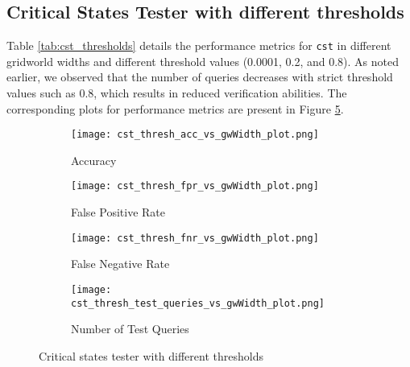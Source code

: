 \subsection{Critical States Tester with different thresholds}
Table \ref{tab:cst_thresholds} details the performance metrics for \texttt{cst} in different gridworld widths and different threshold values (0.0001, 0.2, and 0.8). As noted earlier, we observed that the number of queries decreases with strict threshold values such as 0.8, which results in reduced verification abilities. The corresponding plots for performance metrics are present in Figure \ref{fig:cst_threshold_experiments}.

\begin{figure}[h]
     \centering
     \begin{subfigure}[h]{0.4\textwidth}
         \centering
         \texttt{[image: cst\_thresh\_acc\_vs\_gwWidth\_plot.png]}
         \caption{Accuracy}
         \label{fig:cst_threshold_acc_vs_features_plot}
     \end{subfigure}
    \hspace{5mm}
     \begin{subfigure}[h]{0.4\textwidth}
         \centering
         \texttt{[image: cst\_thresh\_fpr\_vs\_gwWidth\_plot.png]}
         \caption{False Positive Rate}
         \label{fig:cst_threshold_fpr_vs_features_plot}
     \end{subfigure}
     \hspace{5mm}
     \begin{subfigure}[h]{0.4\textwidth}
         \centering
         \texttt{[image: cst\_thresh\_fnr\_vs\_gwWidth\_plot.png]}
         \caption{False Negative Rate}
         \label{fig:cst_threshold_fnr_vs_features_plot}
     \end{subfigure}
     \hspace{5mm}
    \begin{subfigure}[h]{0.4\textwidth}
         \centering
         \texttt{[image: cst\_thresh\_test\_queries\_vs\_gwWidth\_plot.png]}
         \caption{Number of Test Queries}
         \label{fig:cst_threshold_test_queries_vs_features_plot}
     \end{subfigure}
    \caption{Critical states tester with different thresholds}
    \label{fig:cst_threshold_experiments}
\end{figure}


